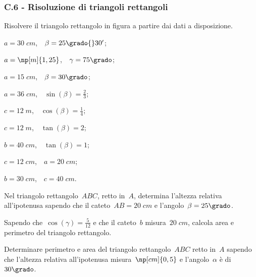 \subsubsection*{C.6 - Risoluzione di triangoli rettangoli}

\begin{esercizio}
\label{ese:C.7}%
Risolvere il triangolo rettangolo in figura a partire dai dati a disposizione.
\begin{multicols}{2}
\begin{center}
 
\end{center}
\begin{enumeratea}
 \item $a=30\;\unit{cm}$,$\quad\beta=25\grado{}30'$;
 \item $a=\np[m]{1,25}$,$\quad\gamma=75\grado$;
 \item $a=15\;\unit{cm}$,$\quad\beta=30\grado$;
 \item $a=36\;\unit{cm}$,$\quad\sin(\beta)=\frac{2}{3}$;
 \item $c=12\;\unit{m}$,$\quad\cos(\beta)=\frac{1}{4}$;
 \item $c=12\;\unit{m}$,$\quad\tan(\beta)=2$;
 \item $b=40\;\unit{cm}$,$\quad\tan(\beta)=1$;
 \item $c=12\;\unit{cm}$,$\quad a=20\;\unit{cm}$;
 \item $b=30\;\unit{cm}$,$\quad c=40\;\unit{cm}$.
\end{enumeratea}
\end{multicols}
\end{esercizio}

\begin{esercizio}
\label{ese:C.8}
Nel triangolo rettangolo~$ABC$, retto in~$A$, determina l'altezza relativa all'ipotenusa sapendo che il cateto~${AB} = 20\;\unit{cm}$
e l'angolo~$\beta=25\grado$.
\end{esercizio}

\begin{esercizio}
\label{ese:C.9}
Sapendo che~$\cos(\gamma)=\frac{5}{12}$ e che il cateto~$b$ misura~$20\;\unit{cm}$, calcola area e perimetro del triangolo rettangolo.
\end{esercizio}

\begin{esercizio}
\label{ese:C.10}
Determinare perimetro e area del triangolo rettangolo~$ABC$ retto in~$A$ sapendo che l'altezza relativa all'ipotenusa misura~$\np[cm]{0,5}$
e l'angolo~$\alpha$ è di~$30\grado$.
\end{esercizio}

